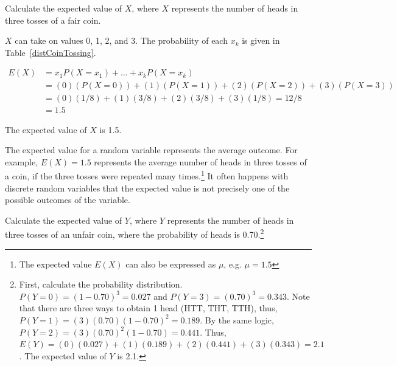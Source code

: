 \begin{example}{Calculate the expected value of $X$, where $X$ represents the number of heads in three tosses of a fair coin.}
	
	$X$ can take on values 0, 1, 2, and 3. The probability of each $x_k$ is given in Table~\ref{distCoinTossing}.

\begin{align*}
E(X) &= x_1 P(X = x_1) + \dots + x_k P(X = x_k)\\
&= (0)(P(X=0)) + (1)(P(X=1)) + (2)(P(X=2)) + (3)(P(X = 3)) \\
&= (0)(1/8) + (1)(3/8) + (2)(3/8) + (3)(1/8) = 12/8 \\
&= 1.5
\end{align*}

The expected value of $X$ is 1.5.	
	
\end{example}

The expected value for a random variable represents the average outcome. For example, $E(X)=1.5$ represents the average number of heads in three tosses of a coin, if the three tosses were repeated many times.\footnote{The expected value $E(X)$ can also be expressed as $\mu$, e.g. $\mu=1.5$}  It often happens with discrete random variables that the expected value is not precisely one of the possible outcomes of the variable.

\vspace{0mm}

\begin{exercise} Calculate the expected value of $Y$, where $Y$ represents the number of heads in three tosses of an unfair coin, where the probability of heads is 0.70.\footnote{First, calculate the probability distribution. $P(Y=0) = (1 - 0.70)^3 = 0.027$ and $P(Y=3) = (0.70)^3 = 0.343.$ Note that there are three ways to obtain 1 head (HTT, THT, TTH), thus, $P(Y=1) = (3)(0.70)(1 - 0.70)^2 = 0.189$. By the same logic, $P(Y = 2) = (3)(0.70)^2( 1- 0.70) = 0.441$. Thus, $E(Y) = (0)(0.027) + (1)(0.189) + (2)(0.441) + (3)(0.343) = 2.1$. The expected value of $Y$ is 2.1. }
	
	
\end{exercise}

